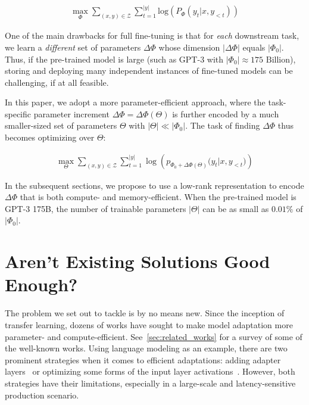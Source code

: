 \begin{align}
    \max_{\Phi} \sum_{(x,y)\in\mathcal{Z}} \sum_{t=1}^{|y|}  \text{log} \left(  P_{\Phi}(y_{t} | x, y_{<t}) \right)
\label{eq:ft_obj}
\end{align}

One of the main drawbacks for full fine-tuning is that for \emph{each} downstream task, we learn a \emph{different} set of parameters $\Delta\Phi$ whose dimension $|\Delta\Phi|$ equals $|\Phi_0|$. 
Thus, if the pre-trained model is large (such as GPT-3 with $|\Phi_0|\approx175 \text{~Billion}$), storing and deploying many independent instances of fine-tuned models can be challenging, if at all feasible. 

In this paper, we adopt a more parameter-efficient approach, where the task-specific parameter increment $\Delta\Phi = \Delta\Phi(\Theta)$ is further encoded by a much smaller-sized set of parameters $\Theta$ with $|\Theta| \ll |\Phi_0|$.
The task of finding $\Delta\Phi$ thus becomes optimizing over $\Theta$:

\begin{align}
    \max_{\Theta} \sum_{(x,y)\in\mathcal{Z}}  \sum_{t=1}^{|y|}  \log\left({p_{\Phi_0+\Delta\Phi(\Theta)}(y_{t} | x, y_{<t}})\right)
\label{eq:ft_add}
\end{align}

In the subsequent sections, we propose to use a low-rank representation to encode $\Delta\Phi$ that is both compute- and memory-efficient. When the pre-trained model is GPT-3 175B, the number of trainable parameters $|\Theta|$ can be as small as $0.01\%$ of $|\Phi_0|$. 

\section{Aren't Existing Solutions Good Enough?}
\label{sec:existing_solutions_no_good}

The problem we set out to tackle is by no means new. Since the inception of transfer learning, dozens of works have sought to make model adaptation more parameter- and compute-efficient.
See~\autoref{sec:related_works} for a survey of some of the well-known works. Using language modeling as an example, there are two prominent strategies when it comes to efficient adaptations: adding adapter layers~\citep{houlsby_parameter-efficient_2019, rebuffi_learning_2017, pfeiffer2021adapterfusion, ruckle2020adapterdrop} or optimizing some forms of the input layer activations~\citep{li_prefix-tuning_2021, lester_power_2021, hambardzumyan_warp_2020, liu_gpt_2021}. However, both strategies have their limitations, especially in a large-scale and latency-sensitive production scenario.

